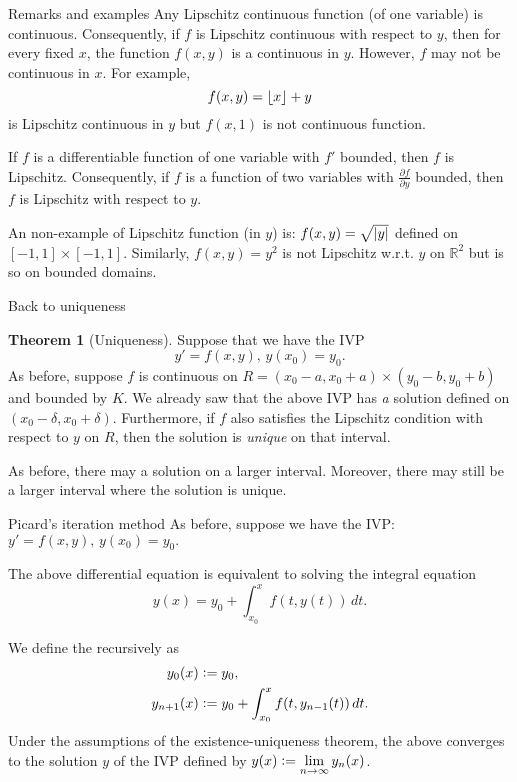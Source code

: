 \documentclass[dvipsnames]{beamer}
\theoremstyle{definition}
\newtheorem{thm}{Theorem}
\begin{document}
\begin{frame}{Remarks and examples}
  Any Lipschitz continuous function (of one variable) is continuous. \pause Consequently, if $f$ is Lipschitz continuous with respect to $y$, then for every fixed $x$, the function $f(x, y)$ is a continuous in $y$. \pause However, $f$ may not be continuous in $x$. \pause For example,
  \begin{equation*} 
    f(x, y) = \left\lfloor x \right\rfloor + y
  \end{equation*}
  is Lipschitz continuous in $y$ but $f(x, 1)$ is not continuous function. \pause

  If $f$ is a differentiable function of one variable with $f'$ bounded, then $f$ is Lipschitz. \pause Consequently, if $f$ is a function of two variables with $\frac{\partial f}{\partial y}$ bounded, then $f$ is Lipschitz with respect to $y$. \pause

  An non-example of Lipschitz function (in $y$) is: $f(x, y) = \sqrt{{\left\lvert y \right\lvert}}$ defined on $[-1, 1] \times [-1, 1]$. \pause Similarly, $f(x, y) = y^{2}$ is not Lipschitz w.r.t. $y$ on $\mathbb{R}^{2}$ but is so on bounded domains.
\end{frame}
\begin{frame}{Back to uniqueness}
  
  \begin{thm}[Uniqueness]
    Suppose that we have the IVP
    \begin{equation*} 
      y' = f(x, y),\, y(x_{0}) = y_{0}.
    \end{equation*} \pause
    As before, suppose $f$ is continuous on $R = (x_{0} - a, x_{0} + a) \times (y_{0} - b, y_{0} + b)$ and bounded by $K$. \pause We already saw that the above IVP has \emph{a} solution defined on $(x_{0} - \delta, x_{0} + \delta)$. \pause Furthermore, if $f$ also satisfies the Lipschitz condition with respect to $y$ on $R$, \pause then the solution is \emph{unique} on that interval.  
  \end{thm} \pause
  As before, there may a solution on a larger interval. \pause Moreover, there may still be a larger interval where the solution is unique.
\end{frame}
\begin{frame}{Picard's iteration method}
  As before, suppose we have the IVP: $y' = f(x, y),\, y(x_{0}) = y_{0}.$ \pause

  The above differential equation is equivalent to solving the integral equation
  \begin{equation*} 
    y(x) = y_{0} + \int_{x_{0}}^{x} f(t, y(t)) \,dt.
  \end{equation*} \pause

  We define the  recursively as \pause
  \begin{align*} 
    y_{0}(x) &\vcentcolon= y_{0}, \\
    y_{n + 1}(x) &\vcentcolon= y_{0} + \int_{x_{0}}^{x} f(t, y_{n - 1}(t)) \,dt.
  \end{align*} \pause
  Under the assumptions of the existence-uniqueness theorem, the above converges to the solution $y$ of the IVP defined by $y(x) \vcentcolon= \displaystyle\lim_{n \to \infty} y_{n}(x)$.
\end{frame}
\end{document}
